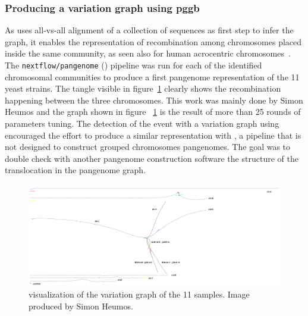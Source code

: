 \subsubsection{Producing a variation graph using pggb}
As \pggb uses all-vs-all alignment of a collection of sequences as first step to infer the graph, it enables the representation of recombination among chromosomes placed inside the same community, as seen also for human acrocentric chromosomes~\cite{Guarracino2023}.\\
The \texttt{nextflow/pangenome} (\pggb) pipeline was run for each of the identified chromosomal communities to produce a first pangenome representation of the 11 yeast strains. The tangle visible in figure~\ref{fig:lodelo_gfaestus} clearly shows the recombination happening between the three chromosomes. This work was mainly done by Simon Heumos and the graph shown in figure ~\ref{fig:lodelo_gfaestus} is the result of more than 25 rounds of parameters tuning.
The detection of the event with a variation graph using \pggb encouraged the effort to produce a similar representation with \mcactus, a pipeline that is not designed to construct grouped chromosomes pangenomes. The goal was to double check with another pangenome construction software the structure of the translocation in the pangenome graph.
\begin{figure}[h!]
	\centering
	\includegraphics[angle=90,width=.4\linewidth]{figures/lodelo/pggb_full.png}
	\caption[\gfaestus visualization of a \lodelo variation graph.]{\gfaestus visualization of the \pggb variation graph of the 11 \lodelo samples. Image produced by Simon Heumos.}
	\label{fig:lodelo_gfaestus}
\end{figure}


